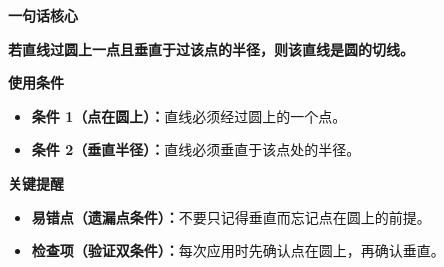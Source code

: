 \begin{summarybox}
	\textbf{\textcolor{CSummary}{一句话核心}}

	\textbf{若直线过圆上一点且垂直于过该点的半径，则该直线是圆的切线。}

	\medskip
	\textbf{\textcolor{CSummary}{使用条件}}
	\begin{itemize}[leftmargin=*, itemsep=0.5em, topsep=0.4em]
		\item \textbf{条件 1（点在圆上）：}直线必须经过圆上的一个点。
		\item \textbf{条件 2（垂直半径）：}直线必须垂直于该点处的半径。
	\end{itemize}

	\medskip
	\textbf{\textcolor{CSummary}{关键提醒}}
	\begin{itemize}[leftmargin=*, itemsep=0.5em, topsep=0.4em]
		\item \textbf{易错点（遗漏点条件）：}不要只记得垂直而忘记点在圆上的前提。
		\item \textbf{检查项（验证双条件）：}每次应用时先确认点在圆上，再确认垂直。
	\end{itemize}
\end{summarybox}
